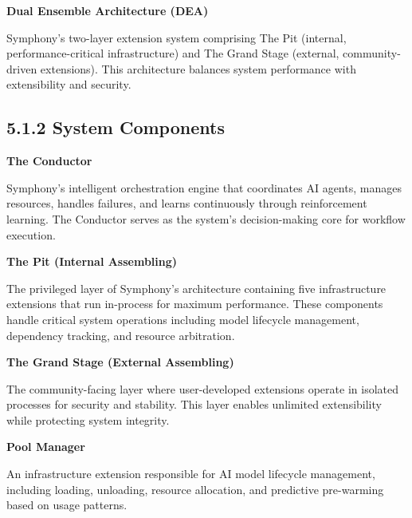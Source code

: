 \vspace{0.3cm}

\noindent\textbf{Dual Ensemble Architecture (DEA)}

Symphony's two-layer extension system comprising The Pit (internal, performance-critical infrastructure) and The Grand Stage (external, community-driven extensions). This architecture balances system performance with extensibility and security.

\subsection*{5.1.2 System Components}

\vspace{0.3cm}

\noindent\textbf{The Conductor}

Symphony's intelligent orchestration engine that coordinates AI agents, manages resources, handles failures, and learns continuously through reinforcement learning. The Conductor serves as the system's decision-making core for workflow execution.

\vspace{0.3cm}

\noindent\textbf{The Pit (Internal Assembling)}

The privileged layer of Symphony's architecture containing five infrastructure extensions that run in-process for maximum performance. These components handle critical system operations including model lifecycle management, dependency tracking, and resource arbitration.

\vspace{0.3cm}

\noindent\textbf{The Grand Stage (External Assembling)}

The community-facing layer where user-developed extensions operate in isolated processes for security and stability. This layer enables unlimited extensibility while protecting system integrity.

\vspace{0.3cm}

\noindent\textbf{Pool Manager}

An infrastructure extension responsible for AI model lifecycle management, including loading, unloading, resource allocation, and predictive pre-warming based on usage patterns.

\vspace{0.3cm}

